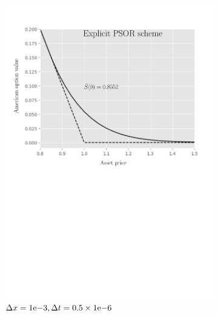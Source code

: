 \begin{figure}[tbp]
\begin{subfigure}{0.4\textwidth}
    \includegraphics[width=\textwidth]{chapters/chapter5/TestCase2ExplicitLCP.pdf}
    \caption{$\Delta{x}={1}\mathrm{e}{-3}, \Delta{t}=0.5\times{1}\mathrm{e}{-6}$}
    \label{fig:lcp:numericaresults:test_case_2_explicit}
  \end{subfigure}
  \begin{subfigure}{0.4\textwidth}
    \centering

\end{subfigure}
\end{figure}
